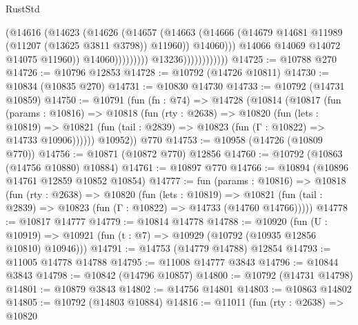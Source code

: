 \begin{lexlean}{RustStd}
\begin{coremodule}
                                              (@14616
                                                (@14623
                                                  (@14626
                                                    (@14657
                                                      (@14663
                                                        (@14666
                                                          (@14679
                                                            @14681
                                                            @11989
                                                            (@11207 (@13625 @3811 @3798))
                                                            @11960))
                                                        @14060)))
                                                  @14066
                                                  @14069
                                                  @14072
                                                  @14075
                                                  @11960))
                                              @14060)))))))))
                            @13236))))))))))))
@14725 := @10788 @270
@14726 := @10796 @12853
@14728 := @10792 (@14726 @10811)
@14730 := @10834 (@10835 @270)
@14731 := @10830 @14730
@14733 := @10792 (@14731 @10859)
@14750 := @10791
    (fun (fn : @74) =>
    @14728
      (@10814
        (@10817
          (fun (params : @10816) =>
          @10818
            (fun (rty : @2638) =>
            @10820
              (fun (lets : @10819) =>
              @10821 (fun (tail : @2839) => @10823 (fun (Γ : @10822) => @14733 @10906))))))
        @10952))
    @770
@14753 := @10958 (@14726 (@10809 @770))
@14756 := @10871 (@10872 @770) @12856
@14760 := @10792 (@10863 (@14756 @10880) @10884)
@14761 := @10897 @770
@14766 := @10894 (@10896 @14761 @12859 @10852 @10854)
@14777 := fun (params : @10816) =>
  @10818
    (fun (rty : @2638) =>
    @10820
      (fun (lets : @10819) =>
      @10821 (fun (tail : @2839) => @10823 (fun (Γ : @10822) => @14733 (@14760 @14766)))))
@14778 := @10817 @14777
@14779 := @10814 @14778
@14788 := @10920
    (fun (U : @10919) => @10921 (fun (t : @7) => @10929 (@10792 (@10935 @12856 @10810) @10946)))
@14791 := @14753 (@14779 @14788) @12854
@14793 := @11005 @14778 @14788
@14795 := @11008 @14777 @3843
@14796 := @10844 @3843
@14798 := @10842 (@14796 @10857)
@14800 := @10792 (@14731 @14798)
@14801 := @10879 @3843
@14802 := @14756 @14801
@14803 := @10863 @14802
@14805 := @10792 (@14803 @10884)
@14816 := @11011
    (fun (rty : @2638) =>
    @10820

\end{coremodule}
\end{lexlean}
